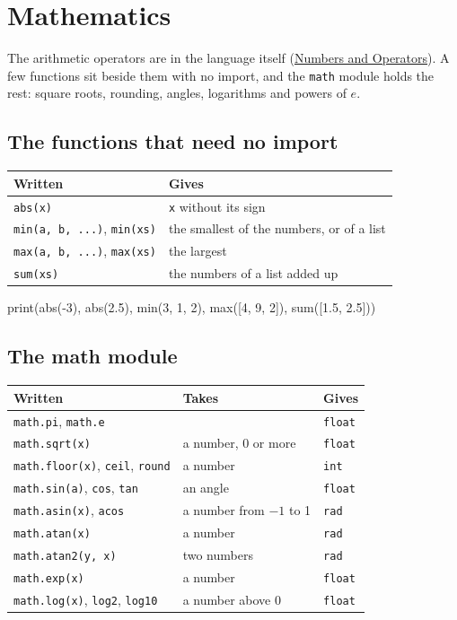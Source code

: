 \chapter{Mathematics}\label{ch-math}

The arithmetic operators are in the language itself
(\hyperref[ch-numbers]{Numbers and Operators}). A few functions sit
beside them with no import, and the \verb|math| module holds the rest:
square roots, rounding, angles, logarithms and powers of $e$.

\section{The functions that need no import}

\begin{center}
\begin{tabular}{lP{8.5cm}}
\toprule
Written & Gives \\
\midrule
\verb|abs(x)| & \verb|x| without its sign \\
\verb|min(a, b, ...)|, \verb|min(xs)| & the smallest of the numbers, or of a list \\
\verb|max(a, b, ...)|, \verb|max(xs)| & the largest \\
\verb|sum(xs)| & the numbers of a list added up \\
\bottomrule
\end{tabular}
\end{center}

\begin{zeno}
print(abs(-3), abs(2.5), min(3, 1, 2), max([4, 9, 2]), sum([1.5, 2.5]))
\end{zeno}

\section{The math module}

\begin{center}
\begin{tabular}{lll}
\toprule
Written & Takes & Gives \\
\midrule
\verb|math.pi|, \verb|math.e| & & \verb|float| \\
\verb|math.sqrt(x)| & a number, 0 or more & \verb|float| \\
\verb|math.floor(x)|, \verb|ceil|, \verb|round| & a number & \verb|int| \\
\verb|math.sin(a)|, \verb|cos|, \verb|tan| & an angle & \verb|float| \\
\verb|math.asin(x)|, \verb|acos| & a number from $-1$ to 1 & \verb|rad| \\
\verb|math.atan(x)| & a number & \verb|rad| \\
\verb|math.atan2(y, x)| & two numbers & \verb|rad| \\
\verb|math.exp(x)| & a number & \verb|float| \\
\verb|math.log(x)|, \verb|log2|, \verb|log10| & a number above 0 & \verb|float| \\
\bottomrule
\end{tabular}
\end{center}

